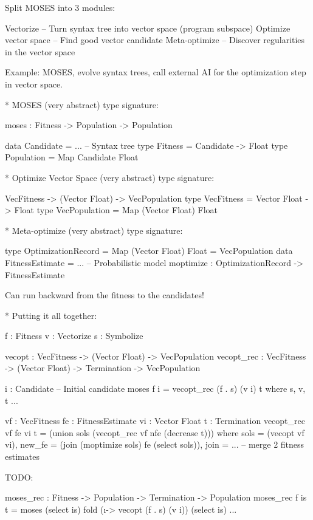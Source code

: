 \documentclass[aspectratio=169]{beamer}
\begin{document}
\begin{frame}

  Split MOSES into 3 modules:

  Vectorize -- Turn syntax tree into vector space (program subspace)
  Optimize vector space -- Find good vector candidate
  Meta-optimize -- Discover regularities in the vector space

  Example: MOSES, evolve syntax trees, call external AI for the
  optimization step in vector space.

  * MOSES (very abstract) type signature:

  moses : Fitness -> Population -> Population

  data Candidate = ... -- Syntax tree
  type Fitness = Candidate -> Float
  type Population = Map Candidate Float

  * Optimize Vector Space (very abstract) type signature:

  VecFitness -> (Vector Float) -> VecPopulation
  type VecFitness = Vector Float -> Float
  type VecPopulation = Map (Vector Float) Float

  * Meta-optimize (very abstract) type signature:

  type OptimizationRecord = Map (Vector Float) Float = VecPopulation
  data FitnessEstimate = ... -- Probabilistic model
  moptimize : OptimizationRecord -> FitnessEstimate

  Can run backward from the fitness to the candidates!

  * Putting it all together:

  f : Fitness
  v : Vectorize
  s : Symbolize

  vecopt : VecFitness -> (Vector Float) -> VecPopulation
  vecopt_rec : VecFitness -> (Vector Float) -> Termination -> VecPopulation

  i : Candidate -- Initial candidate
  moses f i = vecopt_rec (f . s) (v i) t
    where s, v, t ...

  vf : VecFitness
  fe : FitnessEstimate
  vi : Vector Float
  t : Termination
  vecopt_rec vf fe vi t = (union sols (vecopt_rec vf nfe (decrease t)))
    where sols = (vecopt vf vi),
          new_fe = (join (moptimize sols) fe (select sols)),
          join = ... -- merge 2 fitness estimates

  TODO:

  moses_rec : Fitness -> Population -> Termination -> Population
  moses_rec f is t = moses (select is)
    fold (\i -> vecopt (f . s) (v i)) (select is) ...

\end{frame}
\end{document}
